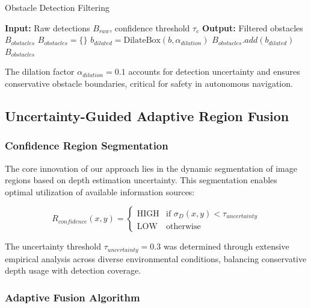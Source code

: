 \documentclass[12pt,oneside]{book}
\begin{document}
\begin{algorithm}
\caption{Obstacle Detection Filtering}
\begin{algorithmic}
\STATE \textbf{Input:} Raw detections $B_{raw}$, confidence threshold $\tau_c$
\STATE \textbf{Output:} Filtered obstacles $B_{obstacles}$
\STATE $B_{obstacles} = \{\}$
        \STATE $b_{dilated} = \text{DilateBox}(b, \alpha_{dilation})$
        \STATE $B_{obstacles}.add(b_{dilated})$
    \ENDIF
\ENDFOR
\RETURN $B_{obstacles}$
\end{algorithmic}
\end{algorithm}

The dilation factor $\alpha_{dilation} = 0.1$ accounts for detection uncertainty and ensures conservative obstacle boundaries, critical for safety in autonomous navigation.

\subsection{Uncertainty-Guided Adaptive Region Fusion}

\subsubsection{Confidence Region Segmentation}

The core innovation of our approach lies in the dynamic segmentation of image regions based on depth estimation uncertainty. This segmentation enables optimal utilization of available information sources:

\begin{equation}
R_{confidence}(x,y) = \begin{cases}
\text{HIGH} & \text{if } \sigma_D(x,y) < \tau_{uncertainty} \\
\text{LOW} & \text{otherwise}
\end{cases}
\label{eq:confidence_segmentation}
\end{equation}

The uncertainty threshold $\tau_{uncertainty} = 0.3$ was determined through extensive empirical analysis across diverse environmental conditions, balancing conservative depth usage with detection coverage.

\subsubsection{Adaptive Fusion Algorithm}
\end{document}
